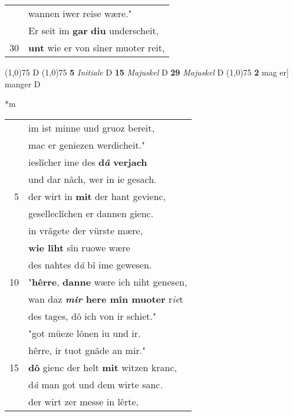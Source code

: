 \documentclass[8pt,a4paper,notitlepage]{article}
\begin{document}
\begin{table}[ht]
\begin{minipage}[t]{0.5\linewidth}
\begin{tabular}{rl}
 & wannen iwer reise wære."\\ 
 & Er seit im \textbf{gar} \textbf{diu} underscheit,\\ 
30 & \textbf{unt} wie er von sîner muoter reit,\\ 
\end{tabular}
\scriptsize
\line(1,0){75} \newline
D \newline
\line(1,0){75} \newline
\textbf{5} \textit{Initiale} D  \textbf{15} \textit{Majuskel} D  \textbf{29} \textit{Majuskel} D  \newline
\line(1,0){75} \newline
\textbf{2} mag er] manger D \newline
\end{minipage}
\hspace{0.5cm}
\begin{minipage}[t]{0.5\linewidth}
\small
\begin{center}*m
\end{center}
\begin{tabular}{rl}
 & im ist minne und gruoz bereit,\\ 
 & mac er geniezen werdicheit."\\ 
 & ieslîcher ime des \textbf{d\textit{â}} \textbf{verjach}\\ 
 & und dar nâch, wer in ie gesach.\\ 
5 & der wirt in \textbf{mit} der hant gevienc,\\ 
 & geselleclîchen er dannen gienc.\\ 
 & in vrâgete der vürste mære,\\ 
 & \textbf{wie lîht} sîn ruowe wære\\ 
 & des nahtes d\textit{â} bî ime gewesen.\\ 
10 & "\textbf{hêrre}, \textbf{dan}\textbf{ne} wære ich niht genesen,\\ 
 & wan daz \textbf{\textit{mir} here mîn muoter} r\textit{ie}t\\ 
 & des tages, dô ich von ir schiet."\\ 
 & "got müeze lônen iu und ir.\\ 
 & hêrre, ir tuot gnâde an mir."\\ 
15 & \textbf{dô} gienc der helt \textbf{mit} witzen kranc,\\ 
 & d\textit{â} man got und dem wirte sanc.\\ 
 & der wirt zer messe in lêrte,\\ 

\end{tabular}
\end{minipage}
\end{table}
\end{document}
